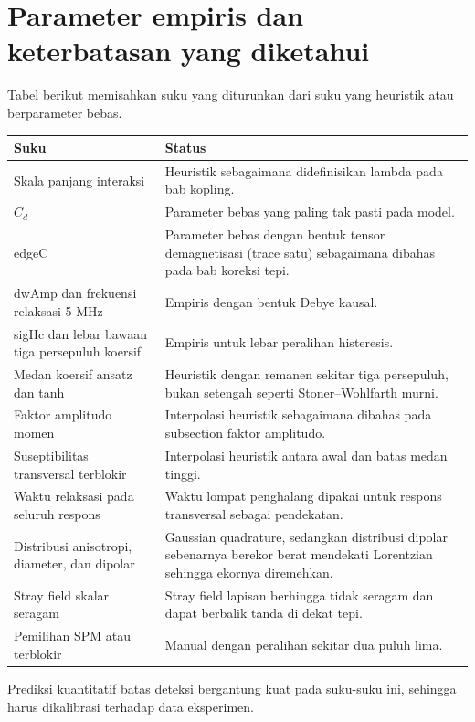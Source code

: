 \documentclass[a4paper,11pt]{article}
\begin{document}
\section{Parameter empiris dan keterbatasan yang diketahui}\label{app:empiris}
Tabel berikut memisahkan suku yang diturunkan dari suku yang heuristik
atau berparameter bebas.
\begin{center}
\small
\begin{tabular}{p{}p{}}
\toprule
Suku & Status\\
\midrule
Skala panjang interaksi & Heuristik sebagaimana didefinisikan lambda
pada bab kopling.\\
$C_{d}$ & Parameter bebas yang paling tak pasti pada model.\\
edgeC & Parameter bebas dengan bentuk tensor demagnetisasi (trace satu)
sebagaimana dibahas pada bab koreksi tepi.\\
dwAmp dan frekuensi relaksasi 5 MHz & Empiris dengan bentuk Debye kausal.\\
sigHc dan lebar bawaan tiga persepuluh koersif & Empiris untuk lebar
peralihan histeresis.\\
Medan koersif ansatz dan tanh & Heuristik dengan remanen sekitar tiga
persepuluh, bukan setengah seperti Stoner--Wohlfarth murni.\\
Faktor amplitudo momen & Interpolasi heuristik sebagaimana dibahas
pada subsection faktor amplitudo.\\
Suseptibilitas transversal terblokir & Interpolasi heuristik antara awal
dan batas medan tinggi.\\
Waktu relaksasi pada seluruh respons & Waktu lompat penghalang dipakai untuk
respons transversal sebagai pendekatan.\\
Distribusi anisotropi, diameter, dan dipolar & Gaussian quadrature, sedangkan
distribusi dipolar sebenarnya berekor berat mendekati Lorentzian sehingga
ekornya diremehkan.\\
Stray field skalar seragam & Stray field lapisan berhingga tidak seragam dan
dapat berbalik tanda di dekat tepi.\\
Pemilihan SPM atau terblokir & Manual dengan peralihan sekitar dua puluh lima.\\
\bottomrule
\end{tabular}
\end{center}
Prediksi kuantitatif batas deteksi bergantung kuat pada suku-suku ini,
sehingga harus dikalibrasi terhadap data eksperimen.
\end{document}
